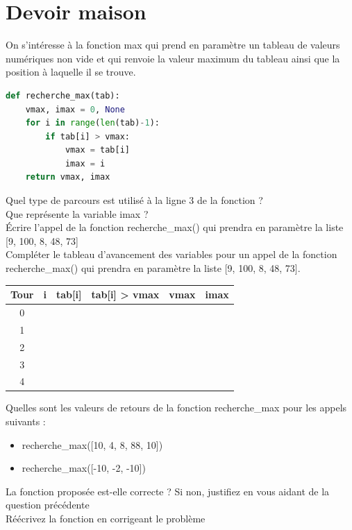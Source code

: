 \section*{Devoir maison }

On s'intéresse à la fonction max qui prend en paramètre un tableau de valeurs numériques non vide et qui renvoie la valeur maximum du tableau ainsi que la position à laquelle il se trouve.

\begin{lstlisting}[language=Python]
def recherche_max(tab):
    vmax, imax = 0, None
    for i in range(len(tab)-1):
        if tab[i] > vmax:
            vmax = tab[i]
            imax = i
    return vmax, imax
\end{lstlisting}

\begin{Exercise}[title={Trouver un maximum}]

\Question Quel type de parcours est utilisé à la ligne 3 de la fonction ?\\
\Question Que représente la variable imax ? \\
\Question Écrire l'appel de la fonction recherche\_max() qui prendra en paramètre la liste [9, 100, 8, 48, 73]\\
\Question Compléter le tableau d'avancement des variables pour un appel de la fonction recherche\_max() qui prendra en paramètre la liste [9, 100, 8, 48, 73].\\
 \begin{center}
\large
\begin{tabular}{c|c|c|c|c|c|}
\textbf{Tour} & \textbf{i} & \textbf{tab[i]} & \textbf{tab[i] > vmax} & \textbf{vmax} & \textbf{imax } \\
\hline
0 &  &  &  & &\\
1 &  &  &  & &\\
2 &  &  &  & &\\
3 &  &  &  & &\\
4 &  &  &  & &
\end{tabular}
\end{center}

\Question Quelles sont les valeurs de retours de la fonction recherche\_max pour les appels suivants : \\
\begin{itemize}
 \item recherche\_max([10, 4, 8, 88, 10])\\ \emptybox{1cm}
 \item recherche\_max([-10, -2, -10]) \\ \emptybox{1cm}
\end{itemize}
\Question La fonction proposée est-elle correcte ? Si non, justifiez en vous aidant de la question précédente\\[0.2cm]
\emptybox{2cm}
\Question Réécrivez la fonction en corrigeant le problème\\[0.2cm]
\emptybox{3cm}

\end{Exercise}